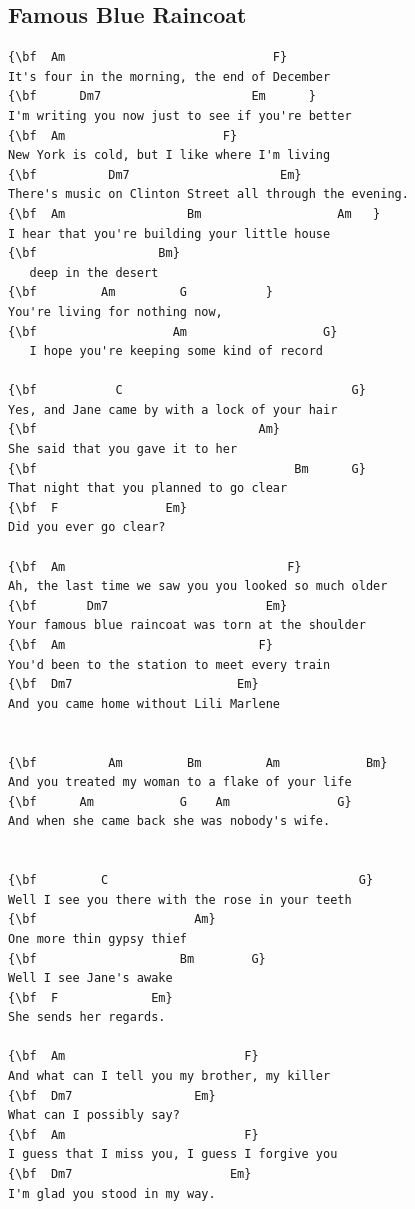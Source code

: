\documentclass[a4paper]{article}
\begin{document}
\subsection{Famous Blue Raincoat}
\begin{Verbatim}[commandchars=\\\{\}]
{\bf  Am                             F}
It's four in the morning, the end of December
{\bf      Dm7                     Em      }
I'm writing you now just to see if you're better
{\bf  Am                      F}
New York is cold, but I like where I'm living
{\bf          Dm7                     Em}
There's music on Clinton Street all through the evening.
{\bf  Am                 Bm                   Am   }
I hear that you're building your little house
{\bf                 Bm}
   deep in the desert
{\bf         Am         G           }
You're living for nothing now,
{\bf                   Am                   G}
   I hope you're keeping some kind of record

{\bf           C                                G}
Yes, and Jane came by with a lock of your hair
{\bf                               Am}
She said that you gave it to her
{\bf                                    Bm      G}
That night that you planned to go clear
{\bf  F               Em}
Did you ever go clear?

{\bf  Am                               F}
Ah, the last time we saw you you looked so much older
{\bf       Dm7                      Em}
Your famous blue raincoat was torn at the shoulder
{\bf  Am                           F}
You'd been to the station to meet every train
{\bf  Dm7                       Em}
And you came home without Lili Marlene


{\bf          Am         Bm         Am            Bm}
And you treated my woman to a flake of your life
{\bf      Am            G    Am               G}
And when she came back she was nobody's wife.


{\bf         C                                   G}
Well I see you there with the rose in your teeth
{\bf                      Am}
One more thin gypsy thief
{\bf                    Bm        G}
Well I see Jane's awake
{\bf  F             Em}
She sends her regards.

{\bf  Am                         F}
And what can I tell you my brother, my killer
{\bf  Dm7                 Em}
What can I possibly say?
{\bf  Am                         F}
I guess that I miss you, I guess I forgive you
{\bf  Dm7                      Em}
I'm glad you stood in my way.


\end{Verbatim}
\end{document}
